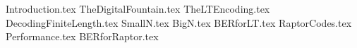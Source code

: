 \documentclass[12pt,a4paper,titlepage]{article}
\begin{document}
\lipsum[1]

{Introduction.tex}
{TheDigitalFountain.tex}
{TheLTEncoding.tex}
{DecodingFiniteLength.tex}
{SmallN.tex}
{BigN.tex}
{BERforLT.tex}
{RaptorCodes.tex}
{Performance.tex}
{BERforRaptor.tex}



\end{document}
